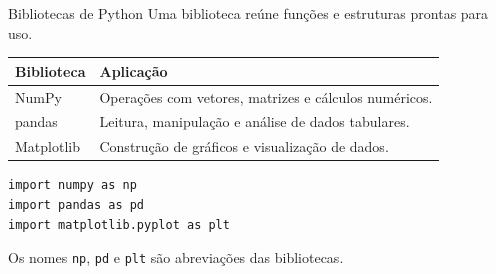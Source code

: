 \begin{frame}[fragile,t]{Bibliotecas de Python}
Uma biblioteca reúne funções e estruturas prontas para uso.

\begin{tabularx}{\linewidth}{@{}lX@{}}
\toprule
\textbf{Biblioteca} & \textbf{Aplicação} \\
\midrule
NumPy & Operações com vetores, matrizes e cálculos numéricos. \\
pandas & Leitura, manipulação e análise de dados tabulares. \\
Matplotlib & Construção de gráficos e visualização de dados. \\
\bottomrule
\end{tabularx}
\begin{lstlisting}
import numpy as np
import pandas as pd
import matplotlib.pyplot as plt
\end{lstlisting}
Os nomes \texttt{np}, \texttt{pd} e \texttt{plt} são abreviações das bibliotecas.
\end{frame}
